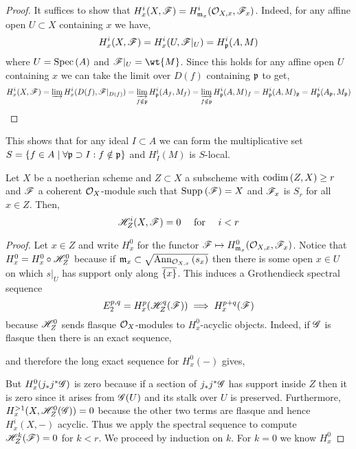\documentclass[12pt]{article}
\begin{document}
\begin{proof}
It suffices to show that $H^i_x(X, \mathscr{F}) = H^i_{\mathfrak{m}_x}(\mathcal{O}_{X, x}, \mathscr{F}_x)$. Indeed, for any affine open $U \subset X$ containing $x$ we have,
\[ H^i_x(X, \mathscr{F}) = H^i_x(U, \mathscr{F}|_U) = H^i_{\mathfrak{p}}(A, M) \]
where $U = \mathrm{Spec}\left( A \right)$ and $\F|_U = \wt{M}$. Since this holds for any affine open $U$ containing $x$ we can take the limit over $D(f)$ containing $\mathfrak{p}$ to get,
\[ H^i_x(X, \mathscr{F}) = \operatorname*{\varinjlim} H^i_x(D(f), \mathscr{F}|_{D(f)}) = \operatorname*{\varinjlim}_{f \notin \mathfrak{p}} H^i_{\mathfrak{p}}(A_f, M_f) = \operatorname*{\varinjlim}_{f \notin \mathfrak{p}} H^i_{\mathfrak{p}}(A, M)_{f} = H^i_{\mathfrak{p}}(A, M)_{\mathfrak{p}} = H^i_{\mathfrak{p}}(A_{\mathfrak{p}}, M_{\mathfrak{p}}) \]
\end{proof}

\begin{rmk}
This shows that for any ideal $I \subset A$ we can form the multiplicative set $S = \{ f \in A \mid \forall \mathfrak{p} \supset I : f \notin \mathfrak{p} \}$ and $H^i_I(M)$ is $S$-local. 
\end{rmk}

\begin{theorem}
Let $X$ be a noetherian scheme and $Z \subset X$ a subscheme with $\mathrm{codim}\left( Z, X \right) \ge r$ and $\mathscr{F}$ a coherent $\mathcal{O}_{X}$-module such that $\mathrm{Supp}_{}\left(\mathscr{F} \right) = X$ and $\mathscr{F}_x$ is $S_r$ for all $x \in Z$. Then,
\[ \mathscr{H}^i_Z(X, \mathscr{F}) = 0 \quad \text{ for } \quad i < r \]
\end{theorem}

\begin{proof}
Let $x \in Z$ and write $H^0_x$ for the functor $\mathscr{F} \mapsto H^0_{\mathfrak{m}_x}(\mathcal{O}_{X, x}, \mathscr{F}_x)$. Notice that $H^0_x = H^0_x \circ \mathscr{H}^0_Z$ because if $\mathfrak{m}_x \subset \sqrt{\mathrm{Ann}_{\mathcal{O}_{X, x}}\left(s_x\right)}$ then there is some open $x \in U$ on which $s|_U$ has support only along $\overline{ \{ x \} }$. This induces a Grothendieck spectral sequence
\[ E^{p,q}_2 = H^p_x(\mathscr{H}^q_Z(\mathscr{F})) \implies H_x^{p+q}(\mathscr{F}) \]
because $\mathscr{H}^0_Z$ sends flasque $\mathcal{O}_{X}$-modules to $H^0_x$-acyclic objects. Indeed, if $\mathscr{G}$ is flasque then there is an exact sequence,
\begin{center}
\end{center}
and therefore the long exact sequence for $H^0_x(-)$ gives,
\begin{center}
\end{center}
But $H^0_x(j_* j^* \mathscr{G})$ is zero because if a section of $j_* j^* \mathscr{G}$ has support inside $Z$ then it is zero since it arises from $\mathscr{G}(U)$ and its stalk over $U$ is preserved. Furthermore, $H^{>1}_x(X, \mathscr{H}^0_Z(\mathscr{G})) = 0$ because the other two terms are flasque and hence $H^i_x(X, -)$ acyclic. Thus we apply the spectral sequence to compute $\mathscr{H}^k_Z(\mathscr{F}) = 0$ for $k < r$. We proceed by induction on $k$. For $k = 0$ we know $H^0_x$
\end{proof}
\end{document}
